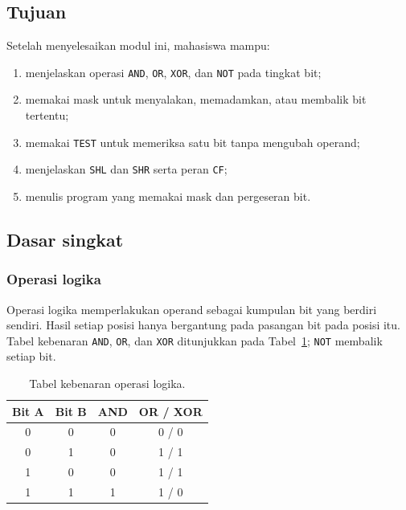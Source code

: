 
\subsection{Tujuan}

\begin{tujuan}
Setelah menyelesaikan modul ini, mahasiswa mampu:
\begin{enumerate}
    \item menjelaskan operasi \texttt{AND}, \texttt{OR},
          \texttt{XOR}, dan \texttt{NOT} pada tingkat bit;
    \item memakai mask untuk menyalakan, memadamkan, atau membalik
          bit tertentu;
    \item memakai \texttt{TEST} untuk memeriksa satu bit tanpa
          mengubah operand;
    \item menjelaskan \texttt{SHL} dan \texttt{SHR} serta peran
          \texttt{CF};
    \item menulis program yang memakai mask dan pergeseran bit.
\end{enumerate}
\end{tujuan}

\subsection{Dasar singkat}

\subsubsection*{Operasi logika}

Operasi logika memperlakukan operand sebagai kumpulan bit yang
berdiri sendiri. Hasil setiap posisi hanya bergantung pada pasangan
bit pada posisi itu. Tabel kebenaran \texttt{AND}, \texttt{OR}, dan
\texttt{XOR} ditunjukkan pada Tabel~\ref{tab:m10-kebenaran};
\texttt{NOT} membalik setiap bit.

\begin{table}[H]
    \centering
    \caption{Tabel kebenaran operasi logika.}
    \label{tab:m10-kebenaran}
    \small
    \begin{tabular}{@{}cccc@{}}
        \toprule
        \textbf{Bit A} & \textbf{Bit B} & \textbf{AND} &
        \textbf{OR} / \textbf{XOR} \\
        \midrule
        0 & 0 & 0 & 0 / 0 \\
        0 & 1 & 0 & 1 / 1 \\
        1 & 0 & 0 & 1 / 1 \\
        1 & 1 & 1 & 1 / 0 \\
        \bottomrule
    \end{tabular}
\end{table}

